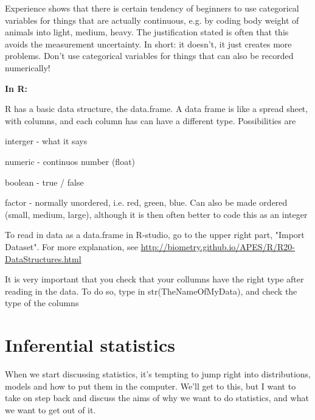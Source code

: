\documentclass[a4paper,twoside]{tufte-book} %
\begin{document}
Experience shows that there is certain tendency of beginners to use categorical variables for things that are actually continuous, e.g. by coding body weight of animals into light, medium, heavy.  The justification stated is often that this avoids the measurement uncertainty. In short: it doesn't, it just creates more problems. Don't use categorical variables for things that can also be recorded numerically! 
\vspace{0.5em}
\begin{fullwidth}
\begin{mdframed}
    
\textbf{In R:} 

R has a basic data structure, the data.frame. A data frame is like a spread sheet, with columns, and each column has can have a different type. Possibilities are

\begin{itemize*}
  \item interger - what it says
  \item numeric - continuos number (float)
  \item boolean - true / false
  \item factor - normally unordered, i.e. red, green, blue. Can also be made ordered (small, medium, large), although it is then often better to code this as an integer
\end{itemize*}

To read in data as a data.frame in R-studio, go to the upper right part, "Import Dataset". For more explanation, see \href{http://biometry.github.io/APES/R/R20-DataStructures.html}{http://biometry.github.io/APES/R/R20-DataStructures.html}

It is very important that you check that your collumns have the right type after reading in the data. To do so, type in str(TheNameOfMyData), and check the type of the columns


\end{mdframed}
\end{fullwidth} 





\chapter{Inferential statistics}

When we start discussing statistics, it's tempting to jump right into distributions, models and how to put them in the computer. We'll get to this, but I want to take on step back and discuss the aims of why we want to do statistics, and what we want to get out of it. 
\end{document}
